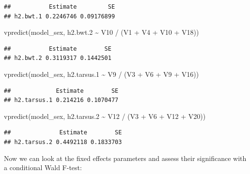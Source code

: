 \documentclass[
  12pt,
]{book}
\newenvironment{Shaded}{\begin{snugshade}}{\end{snugshade}}
\newcommand{\FloatTok}[1]{\textcolor[rgb]{0.00,0.00,0.81}{#1}}
\newcommand{\FunctionTok}[1]{\textcolor[rgb]{0.00,0.00,0.00}{#1}}
\newcommand{\NormalTok}[1]{#1}
\newcommand{\SpecialCharTok}[1]{\textcolor[rgb]{0.00,0.00,0.00}{#1}}
\begin{document}
\begin{verbatim}
##           Estimate         SE
## h2.bwt.1 0.2246746 0.09176899
\end{verbatim}

\begin{Shaded}
\begin{Highlighting}[]
\FunctionTok{vpredict}\NormalTok{(model\_sex, h2.bwt}\FloatTok{.2} \SpecialCharTok{\textasciitilde{}}\NormalTok{ V10 }\SpecialCharTok{/}\NormalTok{ (V1 }\SpecialCharTok{+}\NormalTok{ V4 }\SpecialCharTok{+}\NormalTok{ V10 }\SpecialCharTok{+}\NormalTok{ V18))}
\end{Highlighting}
\end{Shaded}

\begin{verbatim}
##           Estimate        SE
## h2.bwt.2 0.3119317 0.1442501
\end{verbatim}

\begin{Shaded}
\begin{Highlighting}[]
\FunctionTok{vpredict}\NormalTok{(model\_sex, h2.tarsus}\FloatTok{.1} \SpecialCharTok{\textasciitilde{}}\NormalTok{ V9 }\SpecialCharTok{/}\NormalTok{ (V3 }\SpecialCharTok{+}\NormalTok{ V6 }\SpecialCharTok{+}\NormalTok{ V9 }\SpecialCharTok{+}\NormalTok{ V16))}
\end{Highlighting}
\end{Shaded}

\begin{verbatim}
##             Estimate        SE
## h2.tarsus.1 0.214216 0.1070477
\end{verbatim}

\begin{Shaded}
\begin{Highlighting}[]
\FunctionTok{vpredict}\NormalTok{(model\_sex, h2.tarsus}\FloatTok{.2} \SpecialCharTok{\textasciitilde{}}\NormalTok{ V12 }\SpecialCharTok{/}\NormalTok{ (V3 }\SpecialCharTok{+}\NormalTok{ V6 }\SpecialCharTok{+}\NormalTok{ V12 }\SpecialCharTok{+}\NormalTok{ V20))}
\end{Highlighting}
\end{Shaded}

\begin{verbatim}
##              Estimate        SE
## h2.tarsus.2 0.4492118 0.1833703
\end{verbatim}

Now we can look at the fixed effects parameters and assess their significance with a conditional Wald F-test:
\end{document}
